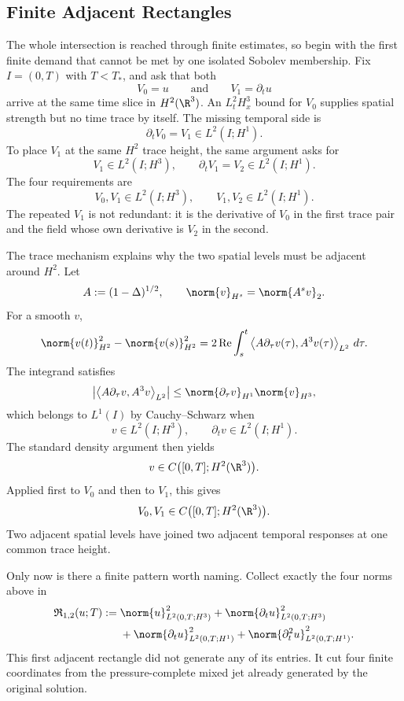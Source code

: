 
\subsection{Finite Adjacent Rectangles}\label{sub:FiniteAdjacentRectangles}

The whole intersection is reached through finite estimates, so begin with the first finite demand that cannot be met by one isolated Sobolev membership.
Fix \(I=(0,T)\) with \(T<T_*\), and ask that both
\[
  V_0=u
  \qquad\text{and}\qquad
  V_1=\partial_tu
\]
arrive at the same time slice in \(H^2(\R^3)\).
An \(L^2_tH^3_x\) bound for \(V_0\) supplies spatial strength but no time trace by itself.
The missing temporal side is
\[
  \partial_tV_0=V_1\in L^2(I;H^1).
\]
To place \(V_1\) at the same \(H^2\) trace height, the same argument asks for
\[
  V_1\in L^2(I;H^3),
  \qquad
  \partial_tV_1=V_2\in L^2(I;H^1).
\]
The four requirements are
\[
  V_0,V_1\in L^2(I;H^3),
  \qquad
  V_1,V_2\in L^2(I;H^1).
\]
The repeated \(V_1\) is not redundant: it is the derivative of \(V_0\) in the first trace pair and the field whose own derivative is \(V_2\) in the second.

The trace mechanism explains why the two spatial levels must be adjacent around \(H^2\).
Let
\[
  A:=(1-\Delta)^{1/2},
  \qquad
  \norm{v}_{H^s}=\norm{A^sv}_2.
\]
For a smooth \(v\),
\[
  \norm{v(t)}_{H^2}^2-\norm{v(s)}_{H^2}^2
  =
  2\operatorname{Re}
  \int_s^t
  \left\langle
    A\partial_\tau v(\tau),
    A^3v(\tau)
  \right\rangle_{L^2}
  \,d\tau.
\]
The integrand satisfies
\[
  \left|
    \left\langle
      A\partial_\tau v,
      A^3v
    \right\rangle_{L^2}
  \right|
  \le
  \norm{\partial_\tau v}_{H^1}
  \norm{v}_{H^3},
\]
which belongs to \(L^1(I)\) by Cauchy--Schwarz when
\[
  v\in L^2(I;H^3),
  \qquad
  \partial_tv\in L^2(I;H^1).
\]
The standard density argument then yields
\[
  v\in C\bigl([0,T];H^2(\R^3)\bigr).
\]
Applied first to \(V_0\) and then to \(V_1\), this gives
\[
  V_0,V_1
  \in
  C\bigl([0,T];H^2(\R^3)\bigr).
\]
Two adjacent spatial levels have joined two adjacent temporal responses at one common trace height.

Only now is there a finite pattern worth naming.
Collect exactly the four norms above in
\begin{align*}
  \mathfrak R_{1,2}(u;T)
  :={}&
  \norm{u}_{L^2(0,T;H^3)}^2
  +
  \norm{\partial_tu}_{L^2(0,T;H^3)}^2
  \\
  &+
  \norm{\partial_tu}_{L^2(0,T;H^1)}^2
  +
  \norm{\partial_t^2u}_{L^2(0,T;H^1)}^2.
\end{align*}
This first adjacent rectangle did not generate any of its entries.
It cut four finite coordinates from the pressure-complete mixed jet already generated by the original solution.

